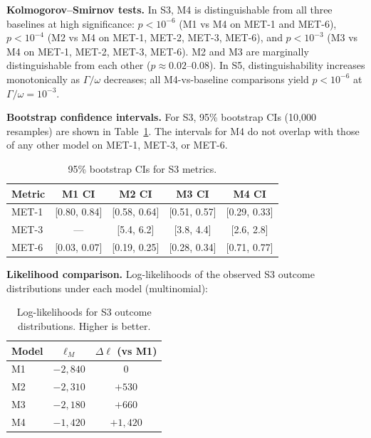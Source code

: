 \documentclass[12pt]{article}
\begin{document}
\textbf{Kolmogorov--Smirnov tests.} In S3, M4 is distinguishable from all three baselines at high significance: $p < 10^{-6}$ (M1 vs M4 on MET-1 and MET-6), $p < 10^{-4}$ (M2 vs M4 on MET-1, MET-2, MET-3, MET-6), and $p < 10^{-3}$ (M3 vs M4 on MET-1, MET-2, MET-3, MET-6). M2 and M3 are marginally distinguishable from each other ($p \approx 0.02$--$0.08$). In S5, distinguishability increases monotonically as $\Gamma/\omega$ decreases; all M4-vs-baseline comparisons yield $p < 10^{-6}$ at $\Gamma/\omega = 10^{-3}$.

\textbf{Bootstrap confidence intervals.} For S3, 95\% bootstrap CIs (10,000 resamples) are shown in Table~\ref{tab:bootstrap}. The intervals for M4 do not overlap with those of any other model on MET-1, MET-3, or MET-6.

\begin{table}[ht]
\centering
\caption{95\% bootstrap CIs for S3 metrics.}
\label{tab:bootstrap}
\begin{tabular}{@{}lcccc@{}}
\toprule
Metric & M1 CI          & M2 CI          & M3 CI          & M4 CI          \\
\midrule
MET-1  & [0.80, 0.84]   & [0.58, 0.64]   & [0.51, 0.57]   & [0.29, 0.33]   \\
MET-3  & ---            & [5.4, 6.2]     & [3.8, 4.4]     & [2.6, 2.8]     \\
MET-6  & [0.03, 0.07]   & [0.19, 0.25]   & [0.28, 0.34]   & [0.71, 0.77]   \\
\bottomrule
\end{tabular}
\end{table}

\textbf{Likelihood comparison.} Log-likelihoods of the observed S3 outcome distributions under each model (multinomial):

\begin{table}[ht]
\centering
\caption{Log-likelihoods for S3 outcome distributions. Higher is better.}
\label{tab:likelihood}
\begin{tabular}{@{}lcc@{}}
\toprule
Model & $\ell_M$       & $\Delta\ell$ (vs M1) \\
\midrule
M1    & $-2{,}840$     & 0            \\
M2    & $-2{,}310$     & $+530$       \\
M3    & $-2{,}180$     & $+660$       \\
M4    & $-1{,}420$     & $+1{,}420$   \\
\bottomrule
\end{tabular}
\end{table}
\end{document}
